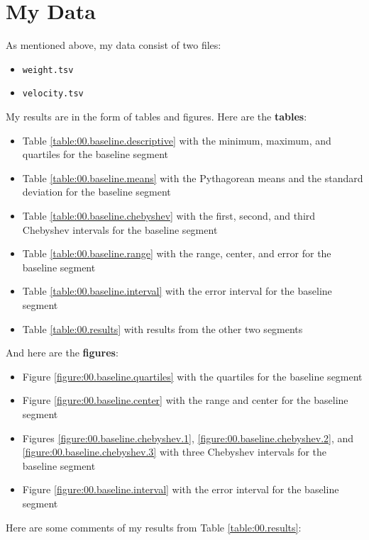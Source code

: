 \section{My Data}
As mentioned above, my data consist of two files:
\begin{itemize}
    \item \texttt{weight.tsv}
    \item \texttt{velocity.tsv}
\end{itemize}
My results are in the form of tables and figures. Here are the \textbf{tables}:
\begin{itemize}
    \item Table \ref{table:00.baseline.descriptive} with the minimum, maximum, and quartiles for the baseline segment
    \item Table \ref{table:00.baseline.means} with the Pythagorean means and the standard deviation for the baseline segment
    \item Table \ref{table:00.baseline.chebyshev} with the first, second, and third Chebyshev intervals for the baseline segment
    \item Table \ref{table:00.baseline.range} with the range, center, and error for the baseline segment
    \item Table \ref{table:00.baseline.interval} with the error interval for the baseline segment
    \item Table \ref{table:00.results} with results from the other two segments
\end{itemize}
And here are the \textbf{figures}:
\begin{itemize}
    \item Figure \ref{figure:00.baseline.quartiles} with the quartiles for the baseline segment
    \item Figure \ref{figure:00.baseline.center} with the range and center for the baseline segment
    \item Figures \ref{figure:00.baseline.chebyshev.1}, \ref{figure:00.baseline.chebyshev.2}, and \ref{figure:00.baseline.chebyshev.3} with three Chebyshev intervals for the baseline segment
    \item Figure \ref{figure:00.baseline.interval} with the error interval for the baseline segment
\end{itemize}
Here are some comments of my results from Table \ref{table:00.results}:
